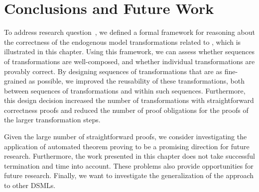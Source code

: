 \section{Conclusions and Future Work}
\label{sec:reusable-correct-transformations:conclusions}
To address research question~, we defined a formal framework for reasoning about the correctness of the endogenous model transformations related to \SLCO, which is illustrated in this chapter.
Using this framework, we can assess whether sequences of transformations are well-composed, and whether individual transformations are provably correct.
By designing sequences of transformations that are as fine-grained as possible, we improved the reusability of these transformations, both between sequences of transformations and within such sequences.
Furthermore, this design decision increased the number of transformations with straightforward correctness proofs and reduced the number of proof obligations for the proofs of the larger transformation steps.

Given the large number of straightforward proofs, we consider investigating the application of automated theorem proving to be a promising direction for future research.
Furthermore, the work presented in this chapter does not take successful termination and time into account.
These problems also provide opportunities for future research.
Finally, we want to investigate the generalization of the approach to other DSMLs.
